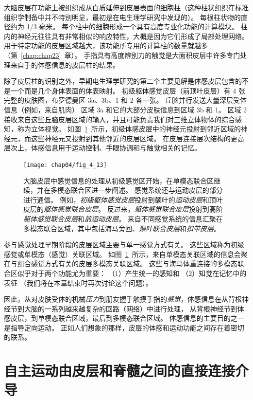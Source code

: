 大脑皮层在功能上被组织成从白质延伸到皮层表面的细胞柱（这种柱状组织在标准组织学制备中并不特别明显，最初是在电生理学研究中发现的）。
每根柱状物的直径约为 1/3 毫米。
每个柱中的细胞形成一个具有高度专业化功能的计算模块。
柱内的神经元往往具有非常相似的响应特性，大概是因为它们形成了局部处理网络。 
用于特定功能的皮层区域越大，该功能所专用的计算柱的数量就越多（第~\ref{chap:chap23}~章）。 
手指具有高度辨别力的触觉是大面积皮层中许多专门处理来自手的体感信息的皮层柱的结果。


除了皮层柱的识别之外，早期电生理学研究的第二个主要见解是体感皮层包含的不是一个而是几个身体表面的体表映射。
初级躯体感觉皮层（前顶叶皮层）有 4 张完整的皮肤图，布罗德曼区 3a、3b、1 和 2 各一张。
丘脑并行发送大量深层受体信息（例如，来自肌肉） 区域 3a 和它的大部分皮肤信息到区域 3b 和 1。
区域 2 接收来自这些丘脑皮层区域的输入，并且可能负责我们对三维立体物体的综合感知，称为立体视觉。
如图~\ref{fig:4_13}~所示，初级体感皮层中的神经元投射到邻近区域的神经元，而这些神经元又投射到其他邻近的皮层区域。
在皮层连接层次结构的更高层次上，体感信息用于运动控制、手眼协调和与触觉相关的记忆。


\begin{figure}[htbp]
	\centering
	\texttt{[image: chap04/fig\_4\_13]}
	\caption{大脑皮层中感觉信息的处理从初级感觉区开始，在单模态联合区继续，并在多模态联合区进一步阐述。
		感觉系统还与运动皮层的部分进行通信。
		例如，\textit{初级躯体感觉皮层}投射到额叶的\textit{运动皮层}和顶叶皮层的\textit{躯体感觉联合皮层}。
		反过来，\textit{躯体感觉联合皮层}投射到高阶\textit{躯体感觉联合皮层}和\textit{前运动皮层}。
		来自不同感觉系统的信息汇聚在多模态联合区域，其中包括海马旁回、\textit{颞叶联合皮层}和\textit{扣带皮层}。}
	\label{fig:4_13}
\end{figure}


参与感觉处理早期阶段的皮层区域主要与单一感觉方式有关。
这些区域称为初级感觉或单模态（感觉）关联区域。
如图~\ref{fig:4_13}~所示，来自单模态关联区域的信息会聚在与组合感觉方式有关的皮层多模态关联区域。
这些与海马体重连接的多模态联合区似乎对于两个功能尤为重要：
（1）产生统一的感知和 
（2）知觉在记忆中的表征
（我们将在本章结束时再次讨论这个问题）。


因此，从对皮肤受体的机械\textit{压力}到朋友握手触摸手指的\textit{感觉}，体感信息在从背根神经节到大脑的一系列越来越复杂的回路（网络）中进行处理，
从背根神经节到体感皮层，到单模态联合区域，最后到多模态联合区域。
体感信息的主要目的之一是指导定向运动。
正如人们想象的那样，皮层的体感和运动功能之间存在着密切的联系。



\section{自主运动由皮层和脊髓之间的直接连接介导}

